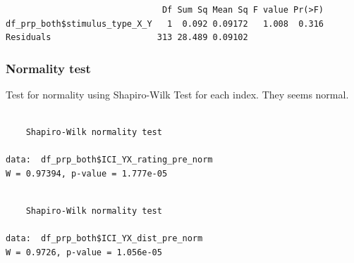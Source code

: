 \documentclass[
  letterpaper,
  DIV=11,
  numbers=noendperiod]{scrartcl}
\newenvironment{Shaded}{\begin{snugshade}}{\end{snugshade}}
\newcommand{\FunctionTok}[1]{\textcolor[rgb]{0.28,0.35,0.67}{#1}}
\newcommand{\NormalTok}[1]{\textcolor[rgb]{0.00,0.23,0.31}{#1}}
\newcommand{\SpecialCharTok}[1]{\textcolor[rgb]{0.37,0.37,0.37}{#1}}
\begin{document}
\begin{Shaded}
\end{Shaded}

\begin{verbatim}
                               Df Sum Sq Mean Sq F value Pr(>F)
df_prp_both$stimulus_type_X_Y   1  0.092 0.09172   1.008  0.316
Residuals                     313 28.489 0.09102               
\end{verbatim}

\subsubsection{Normality test}\label{normality-test}

Test for normality using Shapiro-Wilk Test for each index. They seems
normal.

\begin{Shaded}
\end{Shaded}

\begin{verbatim}

    Shapiro-Wilk normality test

data:  df_prp_both$ICI_YX_rating_pre_norm
W = 0.97394, p-value = 1.777e-05
\end{verbatim}

\begin{Shaded}
\end{Shaded}

\begin{verbatim}

    Shapiro-Wilk normality test

data:  df_prp_both$ICI_YX_dist_pre_norm
W = 0.9726, p-value = 1.056e-05
\end{verbatim}
\end{document}
